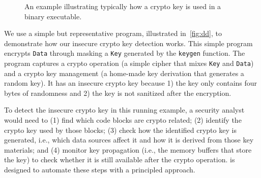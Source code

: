 
\begin{figure}[!htp]
\centering
%

%
\caption{An example illustrating typically how a crypto key is used in a binary executable.}
\label{fig:dd}
\end{figure}

We use a simple but representative program, illustrated in~\autoref{fig:dd}, to demonstrate how our insecure crypto key detection works. 
This simple program encrypts \texttt{Data} 
through masking a \texttt{Key} generated by the \texttt{keygen} function. 
The program captures a crypto operation (a simple cipher that mixes \texttt{Key} and \texttt{Data}) and a crypto key management (a home-made key derivation that generates a random key). 
{It has an insecure crypto key because 1) the key only contains four bytes of randomness and 2) the key is not sanitized after the encryption}.

To detect the insecure crypto key in this running example, a security analyst would need to 
(1) find which code blocks are crypto related; 
(2) identify the crypto key used by those blocks; 
(3) check how the identified crypto key is generated, i.e., which data sources affect it and how it is derived from those key materials; and
(4) monitor key propagation (i.e., the memory buffers that store the key) to check whether it is still available after the crypto operation. 
\sysname is designed to automate these steps with a principled approach. 

